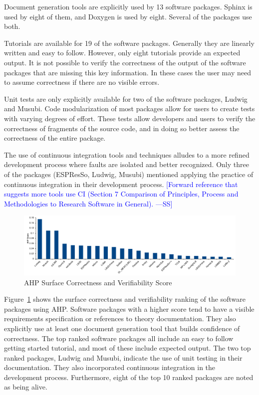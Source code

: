 \documentclass[final, 3p, times, authoryear]{elsarticle}
\newcommand{\authornote}[3]{\textcolor{#1}{[#3 ---#2]}}
\newcommand{\authornote}[3]{}
\newcommand{\wss}[1]{\authornote{blue}{SS}{#1}} %
\begin{document}
Document generation tools are explicitly used by 13 software packages. Sphinx is
used by eight of them, and Doxygen is used by eight. Several of the packages use
both.

Tutorials are available for 19 of the software packages. Generally they are
linearly written and easy to follow. However, only eight tutorials provide an
expected output. It is not possible to verify the correctness of the output of
the software packages that are missing this key information. In these cases the
user may need to assume correctness if there are no visible errors.

Unit tests are only explicitly available for two of the software packages,
Ludwig and Musubi. Code modularization of most packages allow for users to create tests with varying degrees of effort. These tests allow developers and users to verify the correctness of fragments of the source code, and in doing so better assess the correctness of the entire package.

The use of continuous integration tools and techniques alludes to a more refined
development process where faults are isolated and better recognized. Only three
of the packages (ESPResSo, Ludwig, Musubi) mentioned applying the practice of
continuous integration in their development process. \wss{Forward reference that
suggests more tools use CI (Section 7 Comparison of Principles, Process and
Methodologies to Research Software in General).}

\begin{figure}[h!]
	\begin{center}
		\includegraphics[width=1.0\textwidth]{./figures/correctnessverifiability.pdf}
		\caption{AHP Surface Correctness and Verifiability Score}
		\label{Fig_CorrectnessVerifiability}
	\end{center}
\end{figure}

Figure~\ref{Fig_CorrectnessVerifiability} shows the surface correctness and
verifiability ranking of the software packages using AHP. Software packages with
a higher score tend to have a visible requirements specification or references
to theory documentation. They also explicitly use at least one document
generation tool that builds confidence of correctness. The top ranked software
packages all include an easy to follow getting started tutorial, and most of
these include expected output. The two top ranked packages, Ludwig and Musubi, indicate the use of unit testing in their documentation. They also incorporated continuous integration in the development process. Furthermore, eight of the top 10 ranked packages are noted as being alive.
\end{document}
